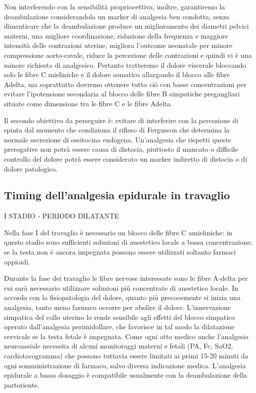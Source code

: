 \documentclass[]{article}
\begin{document}
Non interferendo con la sensibilità propriocettiva, inoltre, garantiremo
la deambulazione considerandola un marker di analgesia ben condotta,
senza dimenticare che la deambulazione produce un miglioramento dei
diametri pelvici materni, una migliore coordinazione, riduzione della
frequenza e maggiore intensità delle contrazioni uterine, migliora
l'outcome neonatale per minore compressione aorto-cavale, riduce la
percezione delle contrazioni e quindi vi è una minore richiesta di
analgesico. Pertanto tratteremo il dolore viscerale bloccando solo le
fibre C mieliniche e il dolore somatico allargando il blocco alle fibre
Adelta, ma soprattutto dovremo ottenere tutto ciò con basse
concentrazioni per evitare l'ipotensione secondaria al blocco delle
fibre B simpatiche pregangliari situate come dimensione tra le fibre C e
le fibre Adelta.

Il secondo obiettivo da perseguire è: evitare di interferire con la
percezione di spinta dal momento che condiziona il rifleso di Fergusson
che determina la normale secrezione di ossitocina endogena. Un'analgesia
che rispetti queste prerogative non potrà essere causa di distocia,
piuttosto il mancato o difficile controllo del dolore potrà essere
considerato un marker indiretto di distocia o di dolore patologico.

\hypertarget{timing-dellanalgesia-epidurale-in-travaglio}{%
\subsection{Timing dell'analgesia epidurale in
travaglio}\label{timing-dellanalgesia-epidurale-in-travaglio}}

I STADIO - PERIODO DILATANTE

Nella fase I del travaglio è necessario un blocco delle fibre C
amieliniche: in questo stadio sono sufficienti soluzioni di anestetico
locale a bassa concentrazione; se la testa non è ancora impegnata
possono essere utilizzati soltanto farmaci oppioidi.

Durante la fase dei travaglio le fibre nervose interessate sono le fibre
A-delta per cui sarà necessario utilizzare soluzioni più concentrate di
anestetico locale. In accordo con la fisiopatologia del dolore, quanto
più precocemente si inizia una analgesia, tanto meno farmaco occorre per
abolire il dolore. L'innervazione simpatica del collo uterino lo rende
sensibile agli effetti del blocco simpatico operato dall'analgesia
perimidollare, che favorisce in tal modo la dilatazione cervicale se la
testa fetale è impegnata. Come ogni atto medico anche l'analgesia
neuroassiale necessita di alcuni monitoraggi materni e fetali (PA, Fc,
SaO2, cardiotocogramma) che possono tuttavia essere limitati ai primi
15-20 minuti da ogni somministrazione di farmaco, salvo diversa
indicazione medica. L'analgesia epidurale a basso dosaggio è compatibile
usualmente con la deambulazione della partoriente.
\end{document}
